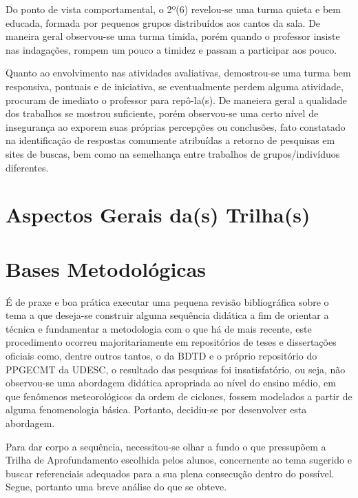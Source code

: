 Do ponto de vista comportamental, o 2º(6) revelou-se uma turma quieta e bem educada, formada por pequenos grupos distribuídos aos cantos da sala. De maneira geral observou-se uma turma tímida, porém quando o professor insiste nas indagações, rompem um pouco a timidez e passam a participar aos pouco.

Quanto ao envolvimento nas atividades avaliativas, demostrou-se uma turma bem responsiva, pontuais e de iniciativa, se eventualmente perdem alguma atividade, procuram de imediato o professor para repô-la(s). De maneiera geral a qualidade dos trabalhos se mostrou suficiente, porém observou-se uma certo nível de insegurança ao exporem suas próprias percepções ou conclusões, fato constatado na identificação de respostas comumente atribuídas a retorno de pesquisas em sites de buscas, bem como na semelhança entre trabalhos de grupos/indivíduos diferentes.

\section{Aspectos Gerais da(s) Trilha(s)} %
\label{sec:Aspectos Gerais da Trilha}
\cite{CADORI:2022}

\section{Bases Metodológicas} %
\label{sec:Bases Metodológicas}
É de praxe e boa prática executar uma pequena revisão bibliográfica sobre o tema a que deseja-se construir alguma sequência didática a fim de orientar a técnica e fundamentar a metodologia com o que há de mais recente, este procedimento ocorreu majoritariamente em repositórios de teses e dissertações oficiais como, dentre outros tantos, o da \ac{BDTD} e o próprio repositório do \ac{PPGECMT} da \ac{UDESC}, o resultado das pesquisas foi insatisfatório, ou seja, não observou-se uma abordagem didática apropriada ao nível do ensino médio, em que fenômenos meteorológicos da ordem de ciclones, fossem modelados a partir de alguma fenomenologia básica. Portanto, decidiu-se por desenvolver esta abordagem.

Para dar corpo a sequência, necessitou-se olhar a fundo o que pressupõem a Trilha de Aprofundamento escolhida pelos alunos, concernente ao tema sugerido e buscar referenciais adequados para a sua plena consecução dentro do possível. Segue, portanto uma breve análise do que se obteve.

